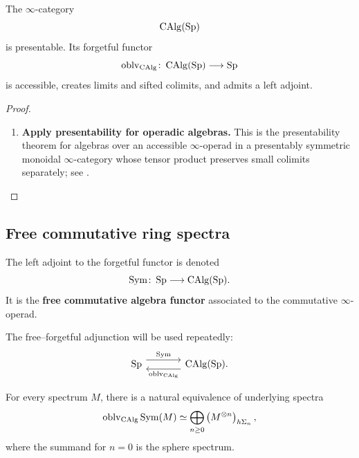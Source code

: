 \begin{proposition}
\label{prop:calg-spectra-presentable}
The $\infty$-category
\[
    \operatorname{CAlg}(\operatorname{Sp})
\]
is presentable. Its forgetful functor
\[
    \operatorname{oblv}_{\operatorname{CAlg}}
    \colon
    \operatorname{CAlg}(\operatorname{Sp})
    \longrightarrow
    \operatorname{Sp}
\]
is accessible, creates limits and sifted colimits, and admits a left
adjoint.
\end{proposition}

\begin{proof}
\leavevmode
\begin{enumerate}[label=\textup{(\arabic*)}]
    \item \textbf{Apply presentability for operadic algebras.}
    This is the presentability theorem for algebras over an accessible
    $\infty$-operad in a presentably symmetric monoidal $\infty$-category
    whose tensor product preserves small colimits separately; see
    \cite{LurieHigherAlgebra}.
\end{enumerate}
\end{proof}

\subsection{Free commutative ring spectra}

\begin{definition}
\label{def:free-commutative-spectral-algebra}
The left adjoint to the forgetful functor is denoted
\[
    \operatorname{Sym}
    \colon
    \operatorname{Sp}
    \longrightarrow
    \operatorname{CAlg}(\operatorname{Sp}).
\]
It is the \textbf{free commutative algebra functor} associated to the
commutative $\infty$-operad.
\end{definition}

The free--forgetful adjunction will be used repeatedly:
\[
\begin{tikzcd}[column sep=large]
    \Sp
        \arrow[r, shift left=1.1ex, "\operatorname{Sym}"]
    &
    \CAlg(\Sp)
        \arrow[l, swap, shift left=1.1ex, "\operatorname{oblv}_{\CAlg}"'].
\end{tikzcd}
\]

\begin{proposition}
\label{prop:underlying-free-spectral-algebra}
For every spectrum $M$, there is a natural equivalence of underlying
spectra
\[
    \operatorname{oblv}_{\operatorname{CAlg}}\operatorname{Sym}(M)
    \simeq
    \bigoplus_{n\geq0}
    \left(M^{\otimes n}\right)_{h\Sigma_n},
\]
where the summand for $n=0$ is the sphere spectrum.
\end{proposition}

